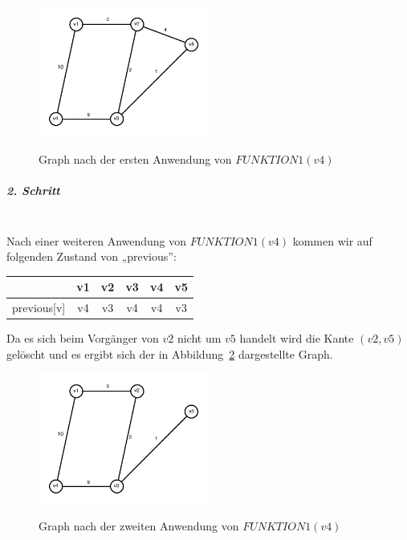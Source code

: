 \documentclass[a4paper, 12pt]{article}
\begin{document}
\begin{figure}[htbp]
	\caption{Graph nach der ersten Anwendung von $FUNKTION1(v4)$}
	\vskip 0.2cm
	\centering
	\includegraphics[width=0.5\textwidth]{Figures/Test_2011-01-14-3A_Step1}
	\label{figure:Test_2011-01-14-3A_Step1}
\end{figure}

\subparagraph{2. Schritt}~\\

Nach einer weiteren Anwendung von $FUNKTION1(v4)$ kommen wir auf folgenden Zustand von „previous”:

\begin{center}
	\begin{tabular}{lccccc}
					& v1	& v2	& v3 & v4	& v5\\
		\hline
		previous[v] & v4	& v3	& v4	& v4 & v3 \\
	\end{tabular}
\end{center}

Da es sich beim Vorgänger von $v2$ nicht um $v5$ handelt wird die Kante $(v2,v5)$ gelöscht und es ergibt sich der in Abbildung~\ref{figure:Test_2011-01-14-3A_Step2} dargestellte Graph.

\begin{figure}[htbp]
	\caption{Graph nach der zweiten Anwendung von $FUNKTION1(v4)$}
	\vskip 0.2cm
	\centering
	\includegraphics[width=0.5\textwidth]{Figures/Test_2011-01-14-3A_Step2}
	\label{figure:Test_2011-01-14-3A_Step2}
\end{figure}
\end{document}
